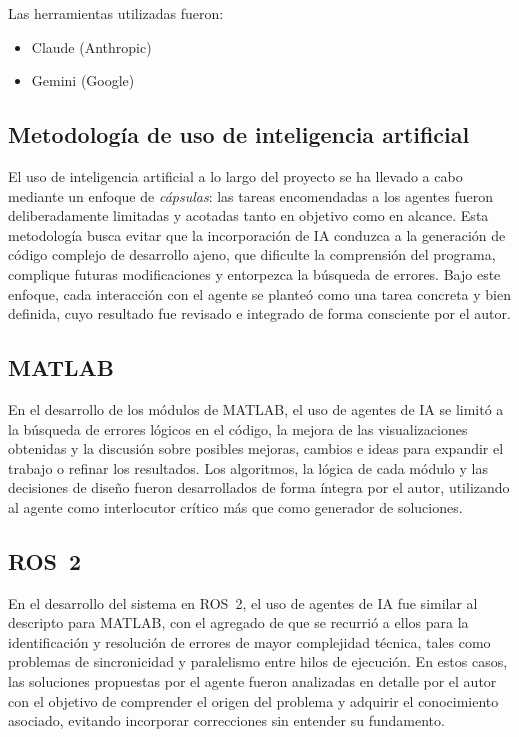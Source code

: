 \documentclass{article}
\begin{document}
Las herramientas utilizadas fueron:

\begin{itemize}
    \item Claude (Anthropic)
    \item Gemini (Google)
\end{itemize}

\subsection{Metodología de uso de inteligencia artificial}

El uso de inteligencia artificial a lo largo del proyecto se ha llevado a cabo mediante un enfoque de \textit{cápsulas}: las tareas encomendadas a los agentes fueron deliberadamente limitadas y acotadas tanto en objetivo como en alcance. Esta metodología busca evitar que la incorporación de IA conduzca a la generación de código complejo de desarrollo ajeno, que dificulte la comprensión del programa, complique futuras modificaciones y entorpezca la búsqueda de errores. Bajo este enfoque, cada interacción con el agente se planteó como una tarea concreta y bien definida, cuyo resultado fue revisado e integrado de forma consciente por el autor.

\subsection{MATLAB}

En el desarrollo de los módulos de MATLAB, el uso de agentes de IA se limitó a la búsqueda de errores lógicos en el código, la mejora de las visualizaciones obtenidas y la discusión sobre posibles mejoras, cambios e ideas para expandir el trabajo o refinar los resultados. Los algoritmos, la lógica de cada módulo y las decisiones de diseño fueron desarrollados de forma íntegra por el autor, utilizando al agente como interlocutor crítico más que como generador de soluciones.

\subsection{ROS~2}

En el desarrollo del sistema en ROS~2, el uso de agentes de IA fue similar al descripto para MATLAB, con el agregado de que se recurrió a ellos para la identificación y resolución de errores de mayor complejidad técnica, tales como problemas de sincronicidad y paralelismo entre hilos de ejecución. En estos casos, las soluciones propuestas por el agente fueron analizadas en detalle por el autor con el objetivo de comprender el origen del problema y adquirir el conocimiento asociado, evitando incorporar correcciones sin entender su fundamento.
\end{document}
